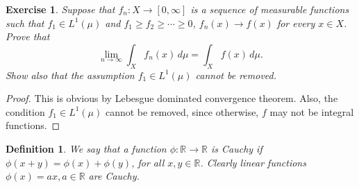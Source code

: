 \documentclass[11pt]{book}
\newtheorem{definition}{Definition}[chapter]
\newtheorem{exercise}{Exercise}[section]
\theoremstyle{definition}
\numberwithin{equation}{chapter}
\begin{document}
\medskip

\begin{exercise}
Suppose that $f_n:X \to [0,\infty]$ is a sequence of measurable functions such that $f_1\in L^1(\mu)$ and
$f_1 \geq f_2 \geq \cdots\geq 0$, $f_n(x) \to f(x)$ for every $x\in X$. Prove that
$$
\lim_{n\to\infty} \int_X f_n(x)\, d\mu = \int_X f(x)\, d\mu.
$$
Show also that the assumption $f_1\in L^1(\mu)$ cannot be removed.
\end{exercise}
\begin{proof}
This is obvious by Lebesgue dominated convergence theorem. Also, the condition $f_1\in L^1(\mu)$ cannot be removed, since otherwise, $f$ may not be integral functions.
\end{proof}

\medskip

\begin{definition}
We say that a function $\phi:\mathbb{R}\to\mathbb{R}$ is Cauchy if $\phi(x+y) = \phi(x) + \phi(y)$, for all $x,y\in\mathbb{R}$. Clearly linear functions $\phi(x) = ax, a \in \mathbb{R}$ are Cauchy.
\end{definition}
\end{document}
